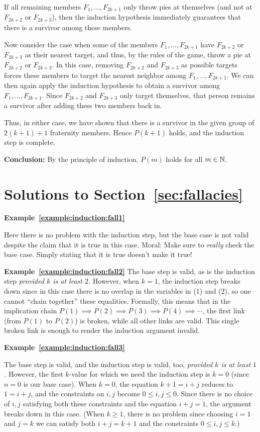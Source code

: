 If all remaining members $F_1,\dots, F_{2k+1}$ only throw  pies at themselves
(and  not at $F_{2k+2}$ or $F_{2k+3}$), then the induction hypothesis
immediately guarantees that there is a survivor among these members. 

Now consider the case when some of the members
$F_1,\dots,F_{2k+1}$
have  $F_{2k+2}$ or
$F_{2k+3}$ as their nearest target, and thus, by the rules of the game, throw a
pie at $F_{2k+2}$ or $F_{2k+3}$.  In this case, removing   $F_{2k+2}$ and
$F_{2k+3}$ as possible targets forces these members to target the nearest
neighbor among 
$F_1,\dots,F_{2k+1}$.
We can then again apply   the
induction hypothesis to obtain a survivor among $F_1,\dots,F_{2k+1}$.
Since $F_{2k+2}$ and $F_{2k+3}$ only target themselves, that person remains a
survivor after adding these two members back in. 

Thus, in either case, we have shown that there is a survivor in the given group of 
$2(k+1)+1$ fraternity members. Hence $P(k+1)$ holds, and the induction step is
complete.   

\textbf{Conclusion:} By the principle of induction, $P(m)$ holds for all
$m\in\mathbb{N}$.

\section{Solutions to Section~\ref{sec:fallacies} } 

\textbf{Example~\ref{example:induction:fall1}}

Here there is no problem with the induction step, but the base case
is not valid despite the claim that it is true in this case.
Moral: Make sure to \emph{really} check the base case. Simply 
stating that it is true doesn't make it true!

\textbf{Example~\ref{example:induction:fall2}}
The base step is valid, as is the induction step \emph{provided $k$
is at least $2$.} However, when $k=1$, the induction step breaks down since in
this case there is no overlap in the variables in (1) and (2), so one cannot
``chain together'' these equalities. Formally, this means that in the
implication chain $P(1)\implies P(2)\implies P(3)\implies P(4)\implies\cdots$, the
first link (from $P(1)$ to $P(2)$) is broken, while all other links are valid.
This single broken link is enough to render the induction argument invalid.


\textbf{Example~\ref{example:induction:fall3}}

The base step is valid, and the induction step is valid, too,
\emph{provided $k$ is at least $1$.} However, the first $k$-value for which
we need the induction step is $k=0$ (since $n=0$ is our base case). When
$k=0$, the equation $k+1=i+j$ reduces to $1=i+j$, 
and the constraints on $i,j$ become $0\le i,j\le 0$. Since there is no  
choice of $i,j$ satisfying both these constraints  and the equation $i+j=1$,
the argument breaks down in this case. (When $k\ge1$, there is no problem
since choosing $i=1$ and $j=k$ we can satisfy both $i+j=k+1$ and 
the constraints $0\le i,j\le k$.)

